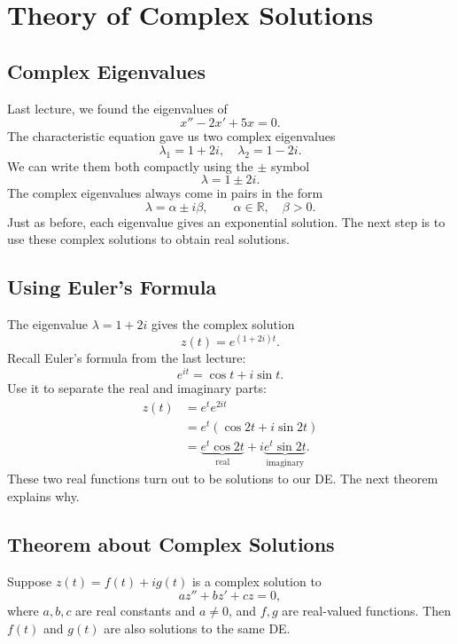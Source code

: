 \documentclass[10pt,letterpaper]{article}
\begin{document}
\section{Theory of Complex Solutions}

\subsection{Complex Eigenvalues}

Last lecture, we found the eigenvalues of
\[
x''-2x'+5x=0.
\]
The characteristic equation gave us two complex eigenvalues
\[
\lambda_1=1+2i,\quad \lambda_2=1-2i.
\]
We can write them both compactly using the $\pm$ symbol
$$
\lambda = 1\pm 2i.
$$
The complex eigenvalues always come in pairs in the form
\[
\lambda=\alpha\pm i\beta,
\qquad \alpha\in\mathbb{R},\quad \beta>0.
\]
Just as before, each eigenvalue gives an exponential solution.
The next step is to use these complex solutions to obtain
real solutions.

\subsection{Using Euler's Formula}

The eigenvalue $\lambda=1+2i$ gives the complex solution
\[
z(t)=e^{(1+2i)t}.
\]
Recall Euler's formula from the last lecture:
\[
e^{it}=\cos t+i\sin t.
\]
Use it to separate the real and imaginary parts:
\begin{align*}
z(t)
&=e^t e^{2it}\\
&=e^t(\cos2t+i\sin2t)\\
&=\underbrace{e^t\cos2t}_{\text{real}}
+i\underbrace{e^t\sin2t}_{\text{imaginary}}.
\end{align*}
These two real functions turn out to be solutions to our DE.
The next theorem explains why.
\subsection{Theorem about Complex Solutions}

\begin{theorem}
Suppose $z(t)=f(t)+ig(t)$ is a complex solution to
\[
az''+bz'+cz=0,
\]
where $a,b,c$ are real constants and $a\ne0$, and $f,g$ are
real-valued functions. Then $f(t)$ and $g(t)$ are also
solutions to the same DE.
\end{theorem}
\end{document}
